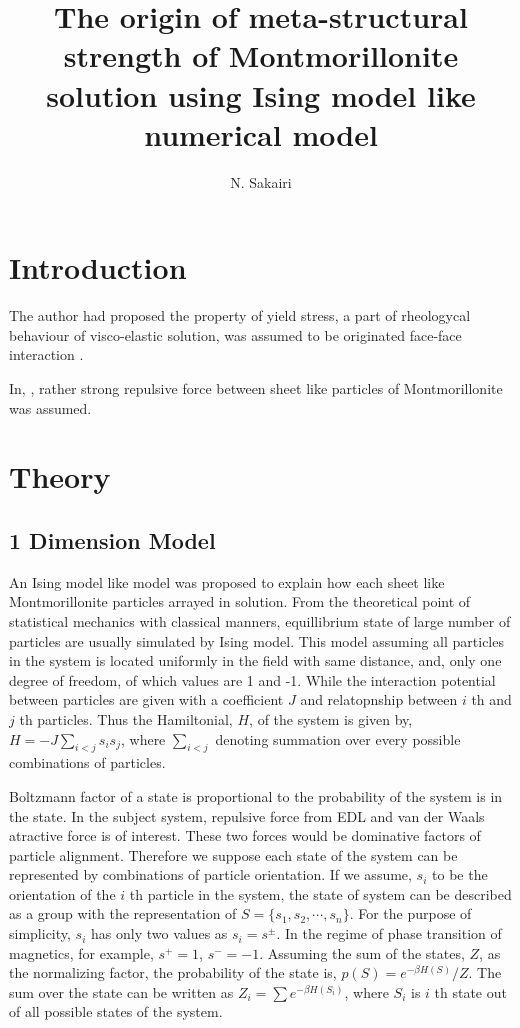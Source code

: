 \documentclass{article}
\author{N. Sakairi}
\title{The origin of meta-structural strength of Montmorillonite solution using Ising model like numerical model}
\begin{document}
\maketitle

\section{Introduction}
The author had proposed the property of yield stress, a part of rheologycal behaviour of visco-elastic solution,
was assumed to be originated face-face interaction \cite{sposito}\cite{adachi}\cite{sakairi}.

In, \cite{sakairi}, rather strong repulsive force between sheet like particles of Montmorillonite was assumed.


\section{Theory}
\subsection{1 Dimension Model}
An Ising model like model was proposed to explain how each sheet like Montmorillonite particles arrayed in solution.
From the theoretical point of statistical mechanics with classical manners, equillibrium state of large number of particles 
are usually simulated by Ising model. 
This model assuming all particles in the system is located uniformly in the field with same distance, 
and, only one degree of freedom, of which values are 1 and -1.
While the interaction potential between particles are given with a coefficient $J$ and relatopnship between $i$ th and $j$ th particles.
Thus the Hamiltonial, $H$, of the system is given by, $H = -J\sum_{i<j} s_is_j$, 
where $\sum_{i<j}$ denoting summation over every possible combinations of particles.

Boltzmann factor of a state is proportional to the probability of the system is in the state.
In the subject system, repulsive force from EDL and van der Waals atractive force is of interest. 
These two forces would be dominative factors of particle alignment.
Therefore we suppose each state of the system can be represented by combinations of particle orientation.
If we assume, $s_i$ to be the orientation of the $i$ th particle in the system, the state of system can be described as a group with the representation of 
 $S = \{s_1, s_2, \cdots, s_n\}$.
For the purpose of simplicity, $s_i$ has only two values as $s_i = s^{\pm}$. 
In the regime of phase transition of magnetics, for example, $s^+ = 1$, $s^- = -1$.
Assuming the sum of the states, $Z$, as the normalizing factor, the probability of the state is, $p (S) = e^{-\beta H(S)} / Z$. 
The sum over the state can be written as $Z_i = \sum e^{-\beta H (S_i)}$, where $S_i$ is $i$ th state out of all possible states of the system.
\end{document}
